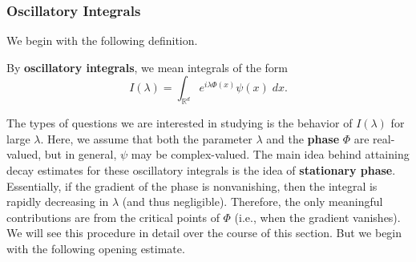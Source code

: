 \documentclass{article}
\begin{document}
\subsubsection{Oscillatory Integrals}

We begin with the following definition.

\begin{definition}
	By \textbf{oscillatory integrals}, we mean integrals of the form 
	\begin{equation*}
		I(\lambda) = \int_{\mathbb{R}^{d}}e^{i\lambda \Phi(x)}\psi(x)\;dx. 
	\end{equation*}
\end{definition} 
The types of questions we are interested in studying is the behavior of $I(\lambda)$ for large $\lambda$. Here, we assume that both the parameter $\lambda$ and the \textbf{phase} $\Phi$ are real-valued, but in general, $\psi$ may be complex-valued. The main idea behind attaining decay estimates for these oscillatory integrals is the idea of \textbf{stationary phase}. Essentially, if the gradient of the phase is nonvanishing, then the integral is rapidly decreasing in $\lambda$ (and thus negligible). Therefore, the only meaningful contributions are from the critical points of $\Phi$ (i.e., when the gradient vanishes). We will see this procedure in detail over the course of this section. But we begin with the following opening estimate. 
\end{document}
